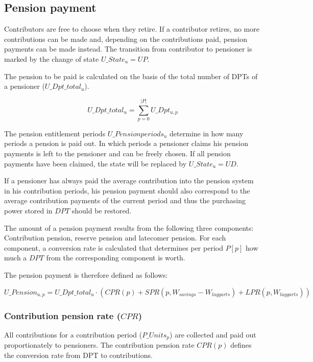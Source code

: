\subsection{Pension payment}

Contributors are free to choose when they retire. If a contributor retires, no more contributions can be made and, depending on the contributions paid, pension payments can be made instead. The transition from contributor to pensioner is marked by the change of state $U\_State_{u} = UP$.

The pension to be paid is calculated on the basis of the total number of DPTs of a pensioner ($U\_Dpt\_total_{u}$).

\begin{equation}
U\_Dpt\_total_{u} = \sum_{p=0}^{|P|} U\_Dpt_{u,p}
\end{equation}

The pension entitlement periods $U\_Pensionperiods_{u}$ determine in how many periods a pension is paid out. In which periods a pensioner claims his pension payments is left to the pensioner and can be freely chosen. If all pension payments have been claimed, the state will be replaced by $U\_State_{u} = UD$.

If a pensioner has always paid the average contribution into the pension system in his contribution periods, his pension payment should also correspond to the average contribution payments of the current period and thus the purchasing power stored in $DPT$ should be restored.

The amount of a pension payment results from the following three components: Contribution pension, reserve pension and latecomer pension. For each component, a conversion rate is calculated that determines per period $P[p]$ how much a $DPT$ from the corresponding component is worth.

The pension payment is therefore defined as follows:

\begin{dmath}
U\_Pension_{u,p} = U\_Dpt\_total_{u} \cdot (CPR(p) + SPR(p, W_{savings} - W_{laggarts}) + LPR(p, W_{laggarts}))
\end{dmath}

\subsubsection{Contribution pension rate ($CPR$)}
All contributions for a contribution period ($P\_Units_{p}$) are collected and paid out proportionately to pensioners. The contribution pension rate $CPR(p)$ defines the conversion rate from DPT to contributions.

